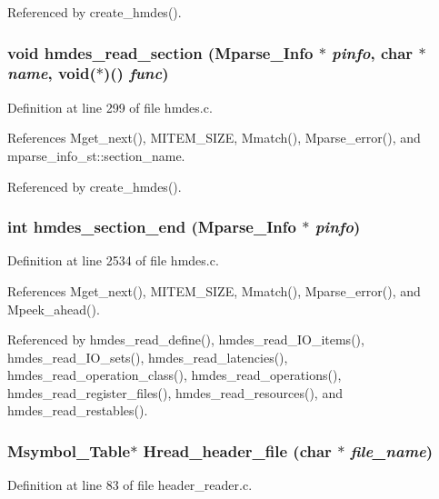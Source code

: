 Referenced by create\_\-hmdes().
\subsubsection{\setlength{\rightskip}{0pt plus 5cm}void hmdes\_\-read\_\-section (\bf{Mparse\_\-Info} $\ast$ {\em pinfo}, char $\ast$ {\em name}, void($\ast$)() {\em func})}\label{hmdes_8h_f122d4b6dad387d560f2445048d82f3f}




Definition at line 299 of file hmdes.c.

References Mget\_\-next(), MITEM\_\-SIZE, Mmatch(), Mparse\_\-error(), and mparse\_\-info\_\-st::section\_\-name.

Referenced by create\_\-hmdes().
\subsubsection{\setlength{\rightskip}{0pt plus 5cm}int hmdes\_\-section\_\-end (\bf{Mparse\_\-Info} $\ast$ {\em pinfo})}\label{hmdes_8h_169537c1ae702279208ac7b91eb1869b}




Definition at line 2534 of file hmdes.c.

References Mget\_\-next(), MITEM\_\-SIZE, Mmatch(), Mparse\_\-error(), and Mpeek\_\-ahead().

Referenced by hmdes\_\-read\_\-define(), hmdes\_\-read\_\-IO\_\-items(), hmdes\_\-read\_\-IO\_\-sets(), hmdes\_\-read\_\-latencies(), hmdes\_\-read\_\-operation\_\-class(), hmdes\_\-read\_\-operations(), hmdes\_\-read\_\-register\_\-files(), hmdes\_\-read\_\-resources(), and hmdes\_\-read\_\-restables().
\subsubsection{\setlength{\rightskip}{0pt plus 5cm}\bf{Msymbol\_\-Table}$\ast$ Hread\_\-header\_\-file (char $\ast$ {\em file\_\-name})}\label{hmdes_8h_2e6daf4ca9e19d27b1a6df7911acff59}




Definition at line 83 of file header\_\-reader.c.

